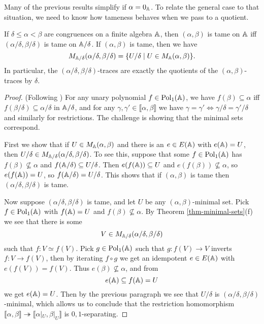 \begin{appendices}
Many of the previous results simplify if $\alpha = 0_{\mathbb{A}}$. To relate the general case to that situation, we need to know how tameness behaves when we pass to a quotient.

\begin{prop}\label{prop-tame-quotient} If $\delta \le \alpha < \beta$ are congruences on a finite algebra $\mathbb{A}$, then $(\alpha,\beta)$ is tame on $\mathbb{A}$ iff $(\alpha/\delta, \beta/\delta)$ is tame on $\mathbb{A}/\delta$. If $(\alpha,\beta)$ is tame, then we have
\[
M_{\mathbb{A}/\delta}(\alpha/\delta,\beta/\delta) = \{U/\delta \mid U \in M_{\mathbb{A}}(\alpha,\beta)\}.
\]
In particular, the $(\alpha/\delta,\beta/\delta)$-traces are exactly the quotients of the $(\alpha,\beta)$-traces by $\delta$.
\end{prop}
\begin{proof} (Following \cite{hobby-mckenzie}) For any unary polynomial $f \in \operatorname{Pol}_1(\mathbb{A})$, we have $f(\beta) \subseteq \alpha$ iff $f(\beta/\delta) \subseteq \alpha/\delta$ in $\mathbb{A}/\delta$, and for any $\gamma, \gamma' \in \llbracket \alpha, \beta \rrbracket$ we have $\gamma = \gamma' \iff \gamma/\delta = \gamma'/\delta$ and similarly for restrictions. The challenge is showing that the minimal sets correspond.%

First we show that if $U \in M_{\mathbb{A}}(\alpha,\beta)$ and there is an $e \in E(\mathbb{A})$ with $e(\mathbb{A}) = U$, then $U/\delta \in M_{\mathbb{A}/\delta}(\alpha/\delta,\beta/\delta)$. To see this, suppose that some $f \in \operatorname{Pol}_1(\mathbb{A})$ has $f(\beta) \not\subseteq \alpha$ and $f(\mathbb{A}/\delta) \subseteq U/\delta$. Then $e(f(\mathbb{A})) \subseteq U$ and $e(f(\beta)) \not\subseteq \alpha$, so $e(f(\mathbb{A})) = U$, so $f(\mathbb{A}/\delta) = U/\delta$. This shows that if $(\alpha,\beta)$ is tame then $(\alpha/\delta, \beta/\delta)$ is tame.

Now suppose $(\alpha/\delta, \beta/\delta)$ is tame, and let $U$ be any $(\alpha,\beta)$-minimal set. Pick $f \in \operatorname{Pol}_1(\mathbb{A})$ with $f(\mathbb{A}) = U$ and $f(\beta) \not\subseteq \alpha$. By Theorem \ref{thm-minimal-sets}(f) we see that there is some
\[
V \in M_{\mathbb{A}/\delta}(\alpha/\delta, \beta/\delta)
\]
such that $f : V \simeq f(V)$. Pick $g \in \operatorname{Pol}_1(\mathbb{A})$ such that $g : f(V) \rightarrow V$ inverts $f : V \rightarrow f(V)$, then by iterating $f\circ g$ we get an idempotent $e \in E(\mathbb{A})$ with $e(f(V)) = f(V)$. Thus $e(\beta) \not\subseteq \alpha$, and from
\[
e(\mathbb{A}) \subseteq f(\mathbb{A}) = U
\]
we get $e(\mathbb{A}) = U$. Then by the previous paragraph we see that $U/\delta$ is $(\alpha/\delta,\beta/\delta)$-minimal, which allows us to conclude that the restriction homomorphism $\llbracket \alpha, \beta \rrbracket \twoheadrightarrow \llbracket \alpha|_U, \beta|_U \rrbracket$ is $0,1$-separating.


\end{proof}
\end{appendices}
